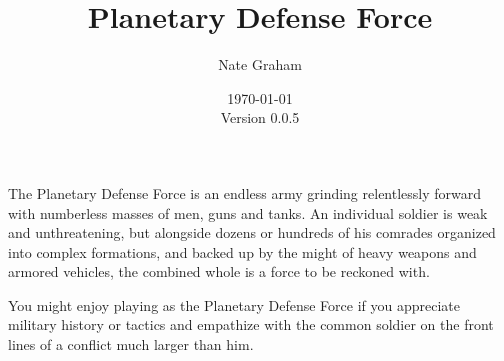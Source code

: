 








\title{Planetary Defense Force}
\author{Nate Graham}
\date{\today\\ Version 0.0.5}

\maketitle

The Planetary Defense Force is an endless army grinding relentlessly forward with numberless masses of men, guns and tanks. An individual soldier is weak and unthreatening, but alongside dozens or hundreds of his comrades organized into complex formations, and backed up by the might of heavy weapons and armored vehicles, the combined whole is a force to be reckoned with.

You might enjoy playing as the Planetary Defense Force if you appreciate military history or tactics and empathize with the common soldier on the front lines of a conflict much larger than him.







\newcommand{\CombatKnife}[1][6+]{Combat Knife: R0 A1 {#1} D0}
\newcommand{\DemoCharges}[1][6+]{Demo Charges: R0 A1 {#1} D6 Critical 9+, Deadly D5+2, Slow, Unstable 1, May only be used against Vehicle or Monster models}
\newcommand{\EnergySword}[1][5+]{Energy Sword: R0 A2 {#1} D6}
\newcommand{\HeavyMeleeWeapon}[1][6+]{Heavy Melee Weapon: R0 A2 {#1} D1}
\newcommand{\HugeMeleeWeapon}[1][4+]{Huge Melee Weapon: R0 A2 {#1} D3 [Deadly 2]}

\newcommand{\BladesAndSaws}[1][7+]{Blades and Saws: R0 A3 {#1} D3 [Deadly 2]}
\newcommand{\CrushingTracks}[1][9+]{Crushing Tracks: R0 A3 {#1} D8 [Deadly 4]}
\newcommand{\ReinforcedRam}[1][6+]{Reinforced Ram: R0 A1 {#1} D5 [Deadly 4]}


